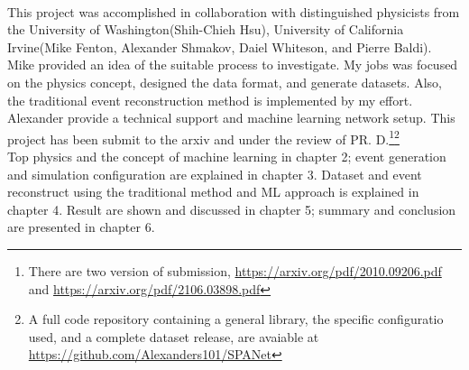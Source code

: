 \\
This project was accomplished in collaboration with distinguished physicists from the University of Washington(Shih-Chieh Hsu), University of California Irvine(Mike Fenton, Alexander Shmakov, Daiel Whiteson, and Pierre Baldi). Mike provided an idea of the suitable process to investigate.  My jobs was focused on the physics concept, designed the data format, and generate datasets. Also, the traditional event reconstruction method is implemented by my effort. Alexander provide a technical support and machine learning network setup. This project has been submit to the arxiv and under the review of PR. D.\footnote{There are two version of submission, \hyperlink{https://arxiv.org/pdf/2010.09206.pdf}{https://arxiv.org/pdf/2010.09206.pdf} and \hyperlink{https://arxiv.org/pdf/2106.03898.pdf}{https://arxiv.org/pdf/2106.03898.pdf}}\footnote{A full code repository containing a general library, the specific configuratio used, and a complete dataset release, are avaiable at \hyperlink{https://github.com/Alexanders101/SPANet}{https://github.com/Alexanders101/SPANet}}
\\
Top physics and the concept of machine learning in chapter 2; event generation and simulation configuration are explained in chapter 3. Dataset and event reconstruct using the traditional method and ML approach is explained in chapter 4. Result are shown and discussed in chapter 5; summary and conclusion are presented in chapter 6.


